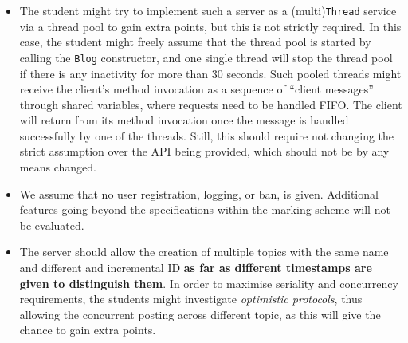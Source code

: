 \documentclass{article}
\begin{document}
\begin{itemize}
 \item The student might try to implement such a server as a (multi)\texttt{Thread} service via a thread pool to gain extra points, but this is not strictly required. In this case, the student might freely assume that the thread pool is started  by calling the \texttt{Blog} constructor, and one single thread will stop the thread pool if there is any inactivity for more than 30 seconds. Such pooled threads might receive the client's method invocation as a sequence of ``client messages'' through shared
		variables, where requests need to be handled FIFO. The client will return from its method invocation once the message is handled successfully by one of the threads.
Still, this should require not changing the strict assumption over the API being provided, which should not be by any means changed.
		\item We assume that no user registration, logging, or ban, is given. Additional features going beyond the specifications within the marking scheme will not be evaluated. 
		\item The server should allow the creation of multiple topics with the same name and different and incremental ID \textbf{as far as different timestamps are given to distinguish them}. In order to maximise seriality and concurrency requirements, the students might investigate \textit{optimistic protocols}, thus allowing the concurrent posting across different topic, as this will give the chance to gain extra points.
%
	\end{itemize}
	
\end{document}
